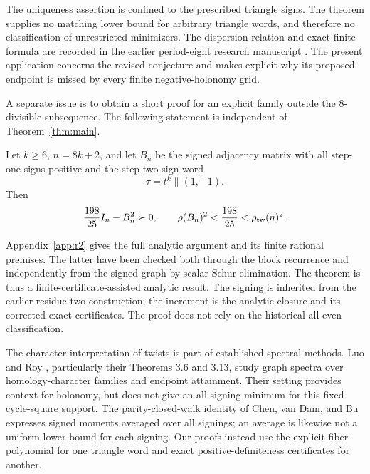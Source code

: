 The uniqueness assertion is confined to the prescribed triangle signs.
The theorem supplies no matching lower bound for arbitrary triangle words,
and therefore no classification of unrestricted minimizers. The dispersion relation and exact finite formula are recorded in the
earlier period-eight research manuscript \cite{EarlierPeriodEight}.
The present application concerns the revised conjecture and makes explicit
why its proposed endpoint is missed by every finite negative-holonomy grid.

A separate issue is to obtain a short proof for an explicit family outside
the $8$-divisible subsequence. The following statement is independent of
Theorem~\ref{thm:main}.

\begin{theorem}\label{thm:r2}
Let $k\ge6$, $n=8k+2$, and let $B_n$ be the signed adjacency matrix with
all step-one signs positive and the step-two sign word
\[
 \tau=t^k\mathbin{\|}(1,-1).
\]
Then
\begin{equation}
 \frac{198}{25}I_n-B_n^2\succ0,
 \qquad
 \rho(B_n)^2<\frac{198}{25}<\rho_{\mathrm{tw}}(n)^2.
 \label{eq:r2}
\end{equation}
\end{theorem}

Appendix~\ref{app:r2} gives the full analytic argument and its finite
rational premises. The latter have been checked both through the block
recurrence and independently from the signed graph by scalar Schur
elimination. The theorem is thus a finite-certificate-assisted analytic
result. The signing is inherited from the earlier residue-two construction;
the increment is the analytic closure and its corrected exact certificates.
The proof does not rely on the historical all-even classification.

The character interpretation of twists is part of established spectral
methods. Luo and Roy \cite{LuoRoy2026}, particularly their Theorems 3.6 and
3.13, study graph spectra over homology-character families and endpoint
attainment. Their setting provides context for holonomy, but does not give
an all-signing minimum for this fixed cycle-square support. The
parity-closed-walk identity of Chen, van Dam, and Bu
\cite[Theorem 3.1]{ChenDamBu2024} expresses signed moments averaged over
all signings; an average is likewise not a uniform lower bound for each
signing. Our proofs instead use the explicit fiber polynomial for one
triangle word and exact positive-definiteness certificates for another.
